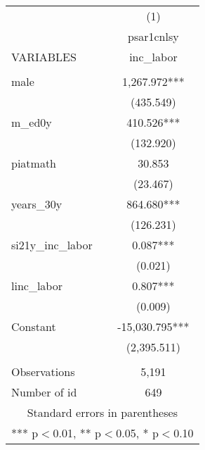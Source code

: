 \begin{tabular}{lc} \hline
 & (1) \\
 & psar1cnlsy \\
VARIABLES & inc\_labor \\ \hline
 &  \\
male & 1,267.972*** \\
 & (435.549) \\
m\_ed0y & 410.526*** \\
 & (132.920) \\
piatmath & 30.853 \\
 & (23.467) \\
years\_30y & 864.680*** \\
 & (126.231) \\
si21y\_inc\_labor & 0.087*** \\
 & (0.021) \\
linc\_labor & 0.807*** \\
 & (0.009) \\
Constant & -15,030.795*** \\
 & (2,395.511) \\
 &  \\
Observations & 5,191 \\
 Number of id & 649 \\ \hline
\multicolumn{2}{c}{ Standard errors in parentheses} \\
\multicolumn{2}{c}{ *** p$<$0.01, ** p$<$0.05, * p$<$0.10} \\
\end{tabular}
